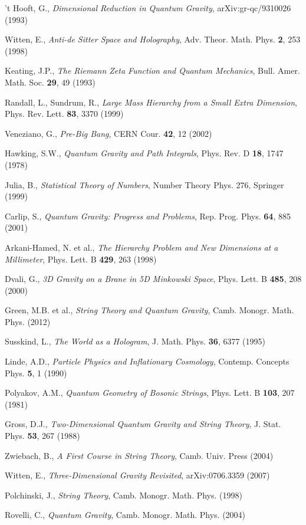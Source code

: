 \documentclass[a4paper, 12pt]{article}
\begin{document}
\begin{thebibliography}{30}
't Hooft, G., \textit{Dimensional Reduction in Quantum Gravity}, arXiv:gr-qc/9310026 (1993)

Witten, E., \textit{Anti-de Sitter Space and Holography}, Adv. Theor. Math. Phys. \textbf{2}, 253 (1998)

Keating, J.P., \textit{The Riemann Zeta Function and Quantum Mechanics}, Bull. Amer. Math. Soc. \textbf{29}, 49 (1993)

Randall, L., Sundrum, R., \textit{Large Mass Hierarchy from a Small Extra Dimension}, Phys. Rev. Lett. \textbf{83}, 3370 (1999)

Veneziano, G., \textit{Pre-Big Bang}, CERN Cour. \textbf{42}, 12 (2002)

Hawking, S.W., \textit{Quantum Gravity and Path Integrals}, Phys. Rev. D \textbf{18}, 1747 (1978)

Julia, B., \textit{Statistical Theory of Numbers}, Number Theory Phys. 276, Springer (1999)

Carlip, S., \textit{Quantum Gravity: Progress and Problems}, Rep. Prog. Phys. \textbf{64}, 885 (2001)

Arkani-Hamed, N. et al., \textit{The Hierarchy Problem and New Dimensions at a Millimeter}, Phys. Lett. B \textbf{429}, 263 (1998)

Dvali, G., \textit{3D Gravity on a Brane in 5D Minkowski Space}, Phys. Lett. B \textbf{485}, 208 (2000)

Green, M.B. et al., \textit{String Theory and Quantum Gravity}, Camb. Monogr. Math. Phys. (2012)

Susskind, L., \textit{The World as a Hologram}, J. Math. Phys. \textbf{36}, 6377 (1995)

Linde, A.D., \textit{Particle Physics and Inflationary Cosmology}, Contemp. Concepts Phys. \textbf{5}, 1 (1990)

Polyakov, A.M., \textit{Quantum Geometry of Bosonic Strings}, Phys. Lett. B \textbf{103}, 207 (1981)

Gross, D.J., \textit{Two-Dimensional Quantum Gravity and String Theory}, J. Stat. Phys. \textbf{53}, 267 (1988)

Zwiebach, B., \textit{A First Course in String Theory}, Camb. Univ. Press (2004)

Witten, E., \textit{Three-Dimensional Gravity Revisited}, arXiv:0706.3359 (2007)

Polchinski, J., \textit{String Theory}, Camb. Monogr. Math. Phys. (1998)

Rovelli, C., \textit{Quantum Gravity}, Camb. Monogr. Math. Phys. (2004)

\end{thebibliography}
\end{document}
